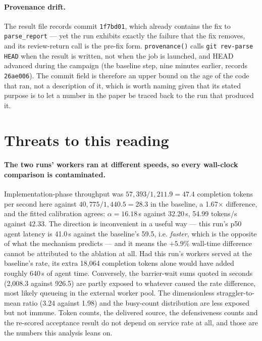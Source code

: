 \documentclass[11pt]{article}
\begin{document}
\paragraph{Provenance drift.} The result file records commit \texttt{1f7bd01}, which already
contains the fix to \texttt{parse\_report} --- yet the run exhibits exactly the failure that the
fix removes, and its review-return call is the pre-fix form. \texttt{provenance()} calls
\texttt{git rev-parse HEAD} when the result is written, not when the job is launched, and HEAD
advanced during the campaign (the baseline step, nine minutes earlier, records \texttt{26ae006}).
The commit field is therefore an upper bound on the age of the code that ran, not a description of
it, which is worth naming given that its stated purpose is to let a number in the paper be traced
back to the run that produced it.

\section{Threats to this reading}
\label{sec:threats}

\paragraph{The two runs' workers ran at different speeds, so every wall-clock comparison is
contaminated.} Implementation-phase throughput was $57{,}393/1{,}211.9 = 47.4$ completion tokens
per second here against $40{,}775/1{,}440.5 = 28.3$ in the baseline, a 1.67$\times$ difference,
and the fitted calibration agrees: $\alpha = 16.18$\,s against 32.20\,s, 54.99 tokens/s against
42.33. The direction is inconvenient in a useful way --- this run's p50 agent latency is 41.0\,s
against the baseline's 59.5, i.e. \emph{faster}, which is the opposite of what the mechanism
predicts --- and it means the $+5.9$\% wall-time difference cannot be attributed to the ablation
at all. Had this run's workers served at the baseline's rate, its extra 18{,}064 completion tokens
alone would have added roughly 640\,s of agent time. Conversely, the barrier-wait sums quoted in
seconds (2{,}008.3 against 926.5) are partly exposed to whatever caused the rate difference, most
likely queueing in the external worker pool. The dimensionless straggler-to-mean ratio (3.24
against 1.98) and the busy-count distribution are less exposed but not immune. Token counts, the
delivered source, the defensiveness counts and the re-scored acceptance result do not depend on
service rate at all, and those are the numbers this analysis leans on.
\end{document}
